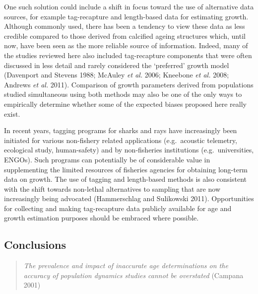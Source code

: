 \documentclass[]{article}
\begin{document}
One such solution could include a shift in focus toward the use of
alternative data sources, for example tag-recapture and length-based
data for estimating growth. Although commonly used, there has been a
tendency to view these data as less credible compared to those derived
from calcified ageing structures which, until now, have been seen as the
more reliable source of information. Indeed, many of the studies
reviewed here also included tag-recapture components that were often
discussed in less detail and rarely considered the `preferred' growth
model (Davenport and Stevens 1988; McAuley \emph{et al.} 2006; Kneebone
\emph{et al.} 2008; Andrews \emph{et al.} 2011). Comparison of growth
parameters derived from populations studied simultaneous using both
methods may also be one of the only ways to empirically determine
whether some of the expected biases proposed here really exist.

In recent years, tagging programs for sharks and rays have increasingly
been initiated for various non-fishery related applications
(e.g.~acoustic telemetry, ecological study, human-safety) and by
non-fisheries institutions (e.g.~universities, ENGOs). Such programs can
potentially be of considerable value in supplementing the limited
resources of fisheries agencies for obtaining long-term data on growth.
The use of tagging and length-based methods is also consistent with the
shift towards non-lethal alternatives to sampling that are now
increasingly being advocated (Hammerschlag and Sulikowski 2011).
Opportunities for collecting and making tag-recapture data publicly
available for age and growth estimation purposes should be embraced
where possible.

\subsection{Conclusions}\label{conclusions}

\begin{quote}
\emph{The prevalence and impact of inaccurate age determinations on the
accuracy of population dynamics studies cannot be overstated} (Campana
2001)
\end{quote}
\end{document}
